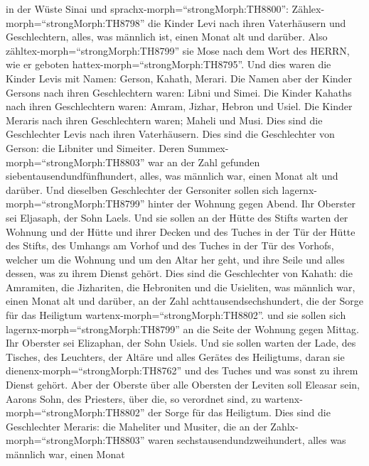 in der Wüste Sinai und sprachx-morph=``strongMorph:TH8800'':
 Zählex-morph=``strongMorph:TH8798'' die Kinder Levi nach
ihren Vaterhäusern und Geschlechtern, alles, was männlich ist, einen
Monat alt und darüber.  Also
zähltex-morph=``strongMorph:TH8799'' sie Mose nach dem Wort des HERRN,
wie er geboten hattex-morph=``strongMorph:TH8795''.  Und
dies waren die Kinder Levis mit Namen: Gerson, Kahath, Merari.
 Die Namen aber der Kinder Gersons nach ihren Geschlechtern
waren: Libni und Simei.  Die Kinder Kahaths nach ihren
Geschlechtern waren: Amram, Jizhar, Hebron und Usiel.  Die
Kinder Meraris nach ihren Geschlechtern waren; Maheli und Musi. Dies
sind die Geschlechter Levis nach ihren Vaterhäusern.  Dies
sind die Geschlechter von Gerson: die Libniter und Simeiter.
 Deren Summex-morph=``strongMorph:TH8803'' war an der Zahl
gefunden siebentausendundfünfhundert, alles, was männlich war, einen
Monat alt und darüber.  Und dieselben Geschlechter der
Gersoniter sollen sich lagernx-morph=``strongMorph:TH8799'' hinter der
Wohnung gegen Abend.  Ihr Oberster sei Eljasaph, der Sohn
Laels.  Und sie sollen an der Hütte des Stifts warten der
Wohnung und der Hütte und ihrer Decken und des Tuches in der Tür der
Hütte des Stifts,  des Umhangs am Vorhof und des Tuches in
der Tür des Vorhofs, welcher um die Wohnung und um den Altar her geht,
und ihre Seile und alles dessen, was zu ihrem Dienst gehört.
 Dies sind die Geschlechter von Kahath: die Amramiten, die
Jizhariten, die Hebroniten und die Usieliten,  was männlich
war, einen Monat alt und darüber, an der Zahl achttausendsechshundert,
die der Sorge für das Heiligtum wartenx-morph=``strongMorph:TH8802''.
 und sie sollen sich lagernx-morph=``strongMorph:TH8799''
an die Seite der Wohnung gegen Mittag.  Ihr Oberster sei
Elizaphan, der Sohn Usiels.  Und sie sollen warten der
Lade, des Tisches, des Leuchters, der Altäre und alles Gerätes des
Heiligtums, daran sie dienenx-morph=``strongMorph:TH8762'' und des
Tuches und was sonst zu ihrem Dienst gehört.  Aber der
Oberste über alle Obersten der Leviten soll Eleasar sein, Aarons Sohn,
des Priesters, über die, so verordnet sind, zu
wartenx-morph=``strongMorph:TH8802'' der Sorge für das Heiligtum.
 Dies sind die Geschlechter Meraris: die Maheliter und
Musiter,  die an der Zahlx-morph=``strongMorph:TH8803''
waren sechstausendundzweihundert, alles was männlich war, einen Monat
